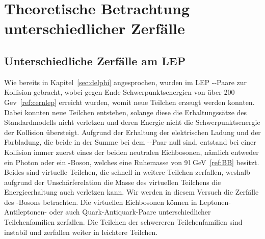 \documentclass[a4paper,ngerman]{scrartcl}
\begin{document}
\section{Theoretische Betrachtung unterschiedlicher Zerfälle}
\label{sec:zerfaelle}

\subsection{Unterschiedliche Zerfälle am LEP}
\label{sec:zerfaelle}
Wie bereits in Kapitel~\ref{sec:delphi} angesprochen, wurden im LEP \Pelectron-\APelectron-Paare zur Kollision gebracht, wobei gegen Ende Schwerpunktsenergien von über 200\,Gev~\ref{ref:cernlep} erreicht wurden,
womit neue Teilchen erzeugt werden konnten.
Dabei konnten neue Teilchen entstehen, 
solange diese die Erhaltungssätze des Standardmodells nicht verletzen 
und deren Energie nicht die Schwerpunktsenergie der Kollision übersteigt.
Aufgrund der Erhaltung der elektrischen Ladung und der Farbladung, 
die beide in der Summe bei dem \Pelectron-\APelectron-Paar null sind,
entstand bei einer Kollision immer zuerst eines der beiden neutralen Eichbosonen,
nämlich entweder ein Photon oder ein \PZzero-Boson,
welches eine Ruhemasse von 91\,GeV~\ref{ref:BB} besitzt.
Beides sind virtuelle Teilchen, die schnell in weitere Teilchen zerfallen,
weshalb aufgrund der Unschärferelation die Masse des virtuellen
Teilchens die Energieerhaltung auch verletzen kann.
Wir werden in diesem Versuch die Zerfälle des \PZzero-Bosons betrachten.
Die virtuellen Eichbosonen können in Leptonen-Antileptonen- oder auch 
Quark-Antiquark-Paare unterschiedlicher Teilchenfamilien zerfallen. 
Die Teilchen der schwereren Teilchenfamilien sind instabil und
zerfallen weiter in leichtere Teilchen.\\
\end{document}
